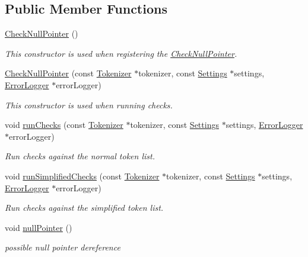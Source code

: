 \subsection*{Public Member Functions}
\begin{DoxyCompactItemize}
\item 
\hyperlink{class_check_null_pointer_a44cc81e49acf6188074c881d9ad36bea}{Check\-Null\-Pointer} ()
\begin{DoxyCompactList}\small\item\em This constructor is used when registering the \hyperlink{class_check_null_pointer}{Check\-Null\-Pointer}. \end{DoxyCompactList}\item 
\hyperlink{class_check_null_pointer_ae63a0cd22c413c9cf1a05a611d6ce300}{Check\-Null\-Pointer} (const \hyperlink{class_tokenizer}{Tokenizer} $\ast$tokenizer, const \hyperlink{class_settings}{Settings} $\ast$settings, \hyperlink{class_error_logger}{Error\-Logger} $\ast$error\-Logger)
\begin{DoxyCompactList}\small\item\em This constructor is used when running checks. \end{DoxyCompactList}\item 
void \hyperlink{class_check_null_pointer_a390bc306808a3c9bcf06b166a46e8f5d}{run\-Checks} (const \hyperlink{class_tokenizer}{Tokenizer} $\ast$tokenizer, const \hyperlink{class_settings}{Settings} $\ast$settings, \hyperlink{class_error_logger}{Error\-Logger} $\ast$error\-Logger)
\begin{DoxyCompactList}\small\item\em Run checks against the normal token list. \end{DoxyCompactList}\item 
void \hyperlink{class_check_null_pointer_a7797df706f04ca03cb638f6db8081c73}{run\-Simplified\-Checks} (const \hyperlink{class_tokenizer}{Tokenizer} $\ast$tokenizer, const \hyperlink{class_settings}{Settings} $\ast$settings, \hyperlink{class_error_logger}{Error\-Logger} $\ast$error\-Logger)
\begin{DoxyCompactList}\small\item\em Run checks against the simplified token list. \end{DoxyCompactList}\item 
void \hyperlink{class_check_null_pointer_a3dd4409792f2a5ed98aa518cf8e665be}{null\-Pointer} ()
\begin{DoxyCompactList}\small\item\em possible null pointer dereference \end{DoxyCompactList}\item 

\end{DoxyCompactItemize}
